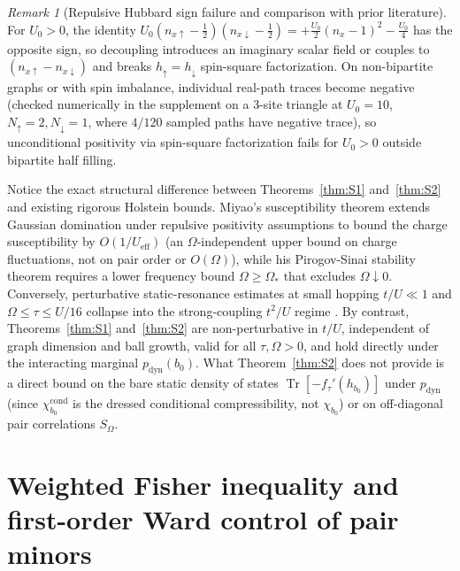 \documentclass[11pt]{article}
\theoremstyle{definition}
\theoremstyle{remark}
\newtheorem{remark}[theorem]{Remark}
\DeclareMathOperator{\Tr}{Tr}
\DeclareMathOperator{\cond}{cond}
\DeclareMathOperator{\dyn}{dyn}
\begin{document}
\begin{remark}[Repulsive Hubbard sign failure and comparison with prior literature]
\label{rem:S2_compare}
For $U_0 > 0$, the identity $U_0(n_{x\uparrow}-\frac{1}{2})(n_{x\downarrow}-\frac{1}{2}) = +\frac{U_0}{2}(n_x-1)^2 - \frac{U_0}{4}$ has the opposite sign, so decoupling introduces an imaginary scalar field or couples to $(n_{x\uparrow} - n_{x\downarrow})$ and breaks $h_\uparrow = h_\downarrow$ spin-square factorization. On non-bipartite graphs or with spin imbalance, individual real-path traces become negative (checked numerically in the supplement on a 3-site triangle at $U_0 = 10$, $N_\uparrow = 2, N_\downarrow = 1$, where $4/120$ sampled paths have negative trace), so unconditional positivity via spin-square factorization fails for $U_0 > 0$ outside bipartite half filling.

Notice the exact structural difference between Theorems~\ref{thm:S1} and~\ref{thm:S2} and existing rigorous Holstein bounds. Miyao's susceptibility theorem \cite{miyao2017} extends Gaussian domination under repulsive positivity assumptions to bound the charge susceptibility by $O(1/U_{\mathrm{eff}})$ (an $\Omega$-independent upper bound on charge fluctuations, not on pair order or $O(\Omega)$), while his Pirogov-Sinai stability theorem \cite{miyao2024} requires a lower frequency bound $\Omega \ge \Omega_*$ that excludes $\Omega \downarrow 0$. Conversely, perturbative static-resonance estimates at small hopping $t/U \ll 1$ and $\Omega \le \tau \le U/16$ collapse into the strong-coupling $t^2/U$ regime \cite{rens2026strong}. By contrast, Theorems~\ref{thm:S1} and~\ref{thm:S2} are non-perturbative in $t/U$, independent of graph dimension and ball growth, valid for all $\tau, \Omega > 0$, and hold directly under the interacting marginal $p_{\dyn}(b_0)$. What Theorem~\ref{thm:S2} does not provide is a direct bound on the bare static density of states $\Tr[-f_\tau'(h_{b_0})]$ under $p_{\dyn}$ (since $\chi_{b_0}^{\cond}$ is the dressed conditional compressibility, not $\chi_{b_0}$) or on off-diagonal pair correlations $S_\Omega$.
\end{remark}

\section{Weighted Fisher inequality and first-order Ward control of pair minors}
\label{sec:ward}
\end{document}
